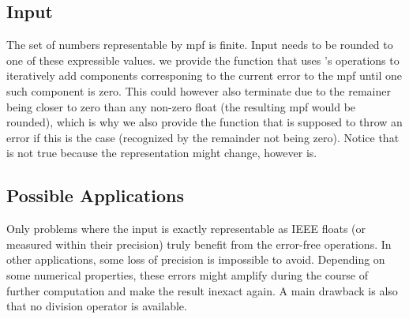 \documentclass[11pt,a4paper]{article}
\begin{document}
\subsection{Input}
The set of numbers representable by mpf is finite.
Input needs to be rounded to one of these expressible values. we provide the
function that uses
's operations to iteratively add components corresponing to the current error to the mpf until one such component is zero. This could however also terminate due to the remainer being closer to zero than any non-zero float (the resulting mpf would be rounded), which is why we also provide the
function that is supposed to throw an error if this is the case (recognized by the remainder not being zero).
Notice that
is not true because the representation might change,
however
is.

\subsection{Possible Applications}
Only problems where the input is exactly representable as IEEE floats (or measured within their precision) truly benefit from the error-free
operations. In other applications, some loss of precision is impossible to avoid. Depending on some numerical properties, these errors might amplify during the course of further computation and make the result inexact again. A main drawback is also that no division operator is available.

%
%
\end{document}
